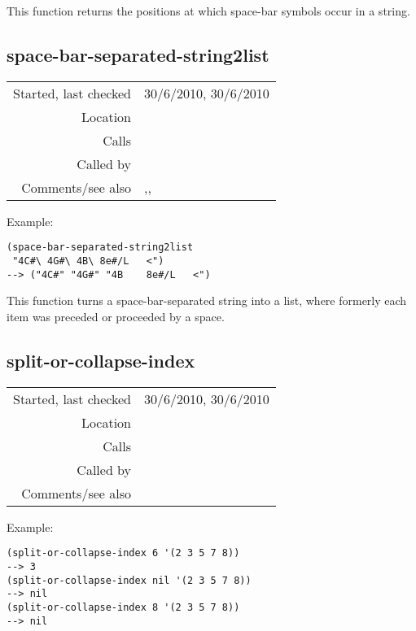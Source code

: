 \noindent This function returns the positions at which
space-bar symbols occur in a string.


\subsection*{space-bar-separated-string2list}\label{fun:space-bar-separated-string2list}

\vspace{0.3cm}
\begin{tabular}{r|p{8cm}}
Started, last checked & 30/6/2010, 30/6/2010 \\
Location & \nameref{sec:kern} \\
Calls & \nameref{fun:space-bar-positions} \\
Called by & \nameref{fun:parse-kern-row} \\
Comments/see also & \nameref{fun:comma-separated-string2list},\newline \nameref{fun:tab-separated-string2list}, \nameref{fun:concat-strings}
\end{tabular}

\vspace{0.5cm}
\noindent Example:
\begin{Verbatim}[showtabs=true]
(space-bar-separated-string2list
 "4C#\ 4G#\ 4B\	8e#/L	<")
--> ("4C#" "4G#" "4B	8e#/L	<")
\end{Verbatim}

\noindent This function turns a space-bar-separated
string into a list, where formerly each item was
preceded or proceeded by a space.


\subsection*{split-or-collapse-index}\label{fun:split-or-collapse-index}

\vspace{0.3cm}
\begin{tabular}{r|p{8cm}}
Started, last checked & 30/6/2010, 30/6/2010 \\
Location & \nameref{sec:kern} \\
Calls & \\
Called by & \nameref{fun:update-staves-variable} \\
Comments/see also &
\end{tabular}

\vspace{0.5cm}
\noindent Example:
\begin{verbatim}
(split-or-collapse-index 6 '(2 3 5 7 8))
--> 3
(split-or-collapse-index nil '(2 3 5 7 8))
--> nil
(split-or-collapse-index 8 '(2 3 5 7 8))
--> nil
\end{verbatim}


